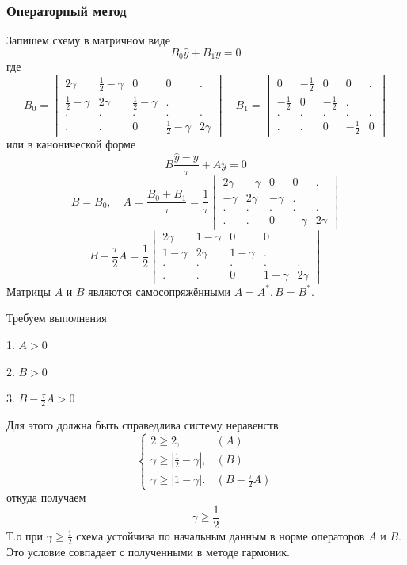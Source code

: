 \documentclass[12pt,a4paper]{article}
\renewcommand{\geq}{\geqslant}
\begin{document}
\subsubsection{Операторный метод}
Запишем схему в матричном виде
$$B_0\hat{y}+B_1 y = 0$$
где $$B_0 = \begin{vmatrix}
2\gamma & \frac{1}{2} - \gamma & 0 & 0&.\\
\frac{1}{2} - \gamma & 2\gamma  & \frac{1}{2} - \gamma & .\\
.&.&.&.&.\\
.&.&0&\frac{1}{2} - \gamma &2\gamma  
\end{vmatrix} \quad B_1 = \begin{vmatrix}
0 & -\frac{1}{2} & 0 & 0&.\\
-\frac{1}{2} & 0 & -\frac{1}{2} & .\\
.&.&.&.&.\\
.&.&0&-\frac{1}{2} & 0
\end{vmatrix}$$
или в канонической форме
$$B\frac{\hat{y}-y}{\tau} + Ay = 0$$
$$B = B_0, \quad A = \frac{B_0+B_1}{\tau} = \frac{1}{\tau}\begin{vmatrix}
2\gamma & - \gamma & 0 & 0&.\\
- \gamma& 2\gamma  & -\gamma & .\\
.&.&.&.&.\\
.&.&0& -\gamma &2\gamma  
\end{vmatrix}$$
$$B-\frac{\tau}{2}A = \frac{1}{2}\begin{vmatrix}
2\gamma & 1 - \gamma & 0 & 0&.\\
1 - \gamma & 2\gamma  & 1 - \gamma & .\\
.&.&.&.&.\\
.&.&0& 1 - \gamma &2\gamma  
\end{vmatrix}$$
Матрицы $A$ и $B$ являются самосопряжёнными $A=A^{*}, B=B^{*}$.
\begin{flushleft}

  Требуем выполнения

  1. $A>0$

  2. $B>0$

  3. $ B-\frac{\tau}{2}A > 0$

\end{flushleft}
Для этого должна быть справедлива систему неравенств
\begin{equation*}
 \begin{cases}
   2\geq2, & (A)
   \\
   \gamma \geq |\frac{1}{2} - \gamma|,  &(B)
   \\
   \gamma \geq |1 - \gamma|. & (B-\frac{\tau}{2}A)
   
 \end{cases}
\end{equation*}
откуда получаем
$$\gamma\geq \frac{1}{2}$$
Т.о при $\gamma\geq \frac{1}{2}$ схема устойчива по начальным данным в норме операторов $A$ и $B$. 
Это условие совпадает с полученными в методе гармоник.
\end{document}
